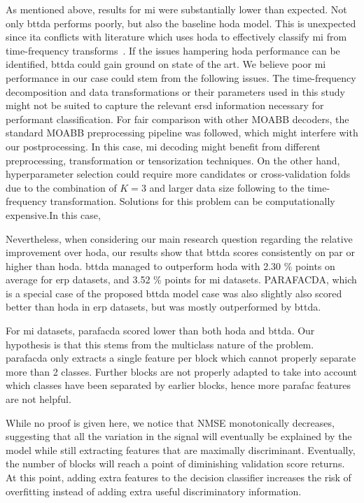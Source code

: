 \documentclass[twocolumn]{article}
\begin{document}
	As mentioned above, results for \ac{mi} were substantially lower than expected.
	Not only \ac{bttda} performs poorly, but also the baseline \ac{hoda} model.
	This is unexpected since ita conflicts with literature which uses \ac{hoda} to
	effectively classify \ac{mi} from time-frequency transforms~\cite{Phan2010,Lotte2018,Liu2015,Cai2021}.
	If the issues hampering \ac{hoda} performance can be identified, \ac{bttda}
	could gain ground on state of the art.
	We believe poor \ac{mi} performance in our case could stem from the following issues.
	The time-frequency decomposition and data transformations or their parameters
	used in this study might not be suited to capture the relevant \ac{ersd}
	information necessary for performant classification.
	For fair comparison with other MOABB decoders, the standard MOABB preprocessing
	pipeline was followed, which might interfere with our postprocessing.
	In this case, \ac{mi} decoding might benefit from different preprocessing,
	transformation or	tensorization techniques.
	On the other hand, hyperparameter selection could require more candidates or
	cross-validation folds due to the combination of $K=3$ and larger data size following to the
	time-frequency transformation.
	Solutions for this problem can be computationally expensive.In this case,

	Nevertheless, when considering our main research question regarding the
	relative improvement over \ac{hoda}, our results show that
	\ac{bttda} scores consistently on par or higher than \ac{hoda}.
	\Ac{bttda} managed to outperform \ac{hoda} with 2.30 \% points on average for
	\ac{erp} datasets, and 3.52 \% points for \ac{mi} datasets.
	PARAFACDA, which is a special case of the proposed \ac{bttda} model
	case was also slightly also scored better than  \ac{hoda} in \ac{erp} datasets,
	but was mostly outperformed by \ac{bttda}.

	For \ac{mi} datasets, \ac{parafacda} scored lower than both \ac{hoda} and \ac{bttda}.
	Our hypothesis is that this stems from the multiclass nature of the problem.
	\Ac{parafacda} only extracts a single feature per block which cannot properly
	separate more than 2 classes.
	Further blocks are not properly adapted to take into account which classes
	have been separated by earlier blocks, hence more \ac{parafac} features
	are not helpful.

	While no proof is given here, we notice that NMSE monotonically decreases,
	suggesting that all the variation in the signal will eventually be explained
	by the model while still extracting features that are maximally discriminant.
	Eventually, the number of blocks will reach a point of diminishing validation
	score returns.
	At this point, adding extra features to the decision classifier increases
	the risk of overfitting instead of adding extra useful discriminatory
	information.
\end{document}
